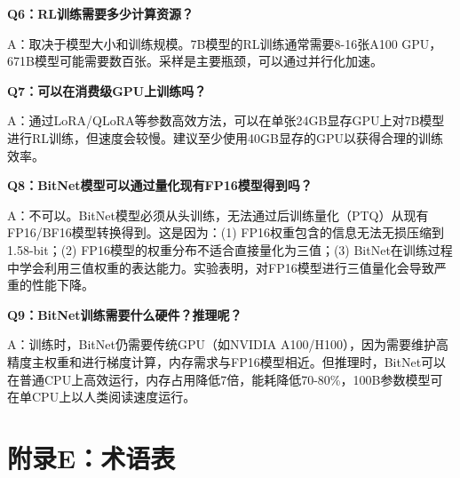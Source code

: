 \documentclass[12pt,a4paper]{article}
\begin{document}
\textbf{Q6：RL训练需要多少计算资源？}

A：取决于模型大小和训练规模。7B模型的RL训练通常需要8-16张A100 GPU，671B模型可能需要数百张。采样是主要瓶颈，可以通过并行化加速。

\textbf{Q7：可以在消费级GPU上训练吗？}

A：通过LoRA/QLoRA等参数高效方法，可以在单张24GB显存GPU上对7B模型进行RL训练，但速度会较慢。建议至少使用40GB显存的GPU以获得合理的训练效率。

\textbf{Q8：BitNet模型可以通过量化现有FP16模型得到吗？}

A：不可以。BitNet模型必须从头训练，无法通过后训练量化（PTQ）从现有FP16/BF16模型转换得到。这是因为：(1) FP16权重包含的信息无法无损压缩到1.58-bit；(2) FP16模型的权重分布不适合直接量化为三值；(3) BitNet在训练过程中学会利用三值权重的表达能力。实验表明，对FP16模型进行三值量化会导致严重的性能下降。

\textbf{Q9：BitNet训练需要什么硬件？推理呢？}

A：训练时，BitNet仍需要传统GPU（如NVIDIA A100/H100），因为需要维护高精度主权重和进行梯度计算，内存需求与FP16模型相近。但推理时，BitNet可以在普通CPU上高效运行，内存占用降低7倍，能耗降低70-80\%，100B参数模型可在单CPU上以人类阅读速度运行。

\section*{附录E：术语表}
\end{document}
